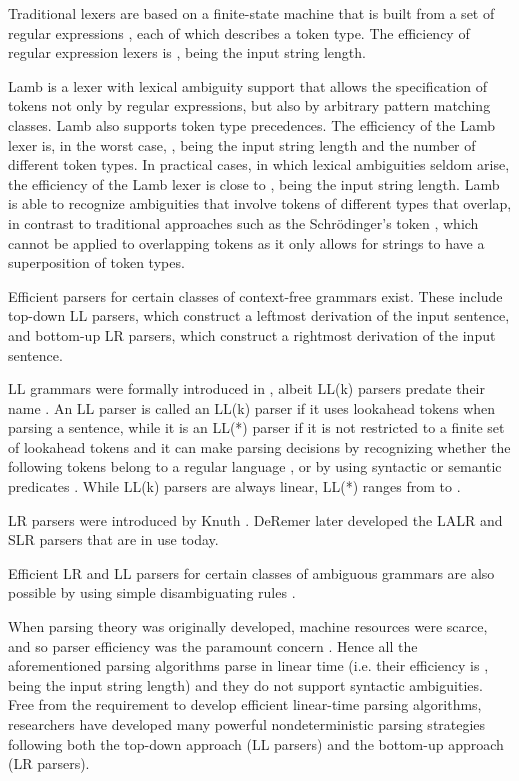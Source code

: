 \documentclass[preprint]{elsarticle}
\begin{document}
Traditional lexers are based on a finite-state machine that is built from a set of regular expressions \cite{McNaughton1960}, each of which describes a token type.
The efficiency of regular expression lexers is , being  the input string length.

Lamb \cite{Quesada2011a} is a lexer with lexical ambiguity support that allows the specification of tokens not only by regular expressions, but also by arbitrary pattern matching classes.
Lamb also supports token type precedences.
The efficiency of the Lamb lexer is, in the worst case, , being  the input string length and  the number of different token types.
In practical cases, in which lexical ambiguities seldom arise, the efficiency of the Lamb lexer is close to , being  the input string length.
Lamb is able to recognize ambiguities that involve tokens of different types that overlap, in contrast to traditional approaches such as the Schr{\"o}dinger's token \cite{Aycock2001}, which cannot be applied to overlapping tokens as it only allows for strings to have a superposition of token types.

Efficient parsers for certain classes of context-free grammars exist.
These include top-down LL parsers, which construct a leftmost derivation of the input sentence, and bottom-up LR parsers, which construct a rightmost derivation of the input sentence.

LL grammars were formally introduced in \cite{Lewis1968}, albeit LL(k) parsers predate their name \cite{Oettinger1961}.
An LL parser is called an LL(k) parser if it uses  lookahead tokens when parsing a sentence, while it is an LL(*) parser if it is not restricted to a finite set of  lookahead tokens and it can make parsing decisions by recognizing whether the following tokens belong to a regular language \cite{Jarzabek1975,Nijholt1976}, or by using syntactic or semantic predicates \cite{Parr1995}.
While LL(k) parsers are always linear, LL(*) ranges from  to .

LR parsers were introduced by Knuth \cite{Knuth1965}.
DeRemer later developed the LALR \cite{DeRemer1969,DeRemer1982} and SLR \cite{DeRemer1971} parsers that are in use today.

Efficient LR and LL parsers for certain classes of ambiguous grammars are also possible by using simple disambiguating rules \cite{Aho1975,Earley1975}.

When parsing theory was originally developed, machine resources were scarce, and so parser efficiency was the paramount concern \cite{Parr2011}.
Hence all the aforementioned parsing algorithms parse in linear time (i.e. their efficiency is , being  the input string length) and they do not support syntactic ambiguities.
Free from the requirement to develop efficient linear-time parsing algorithms, researchers have developed many powerful nondeterministic parsing strategies following both the top-down approach (LL parsers) and the bottom-up approach (LR parsers).
\end{document}
